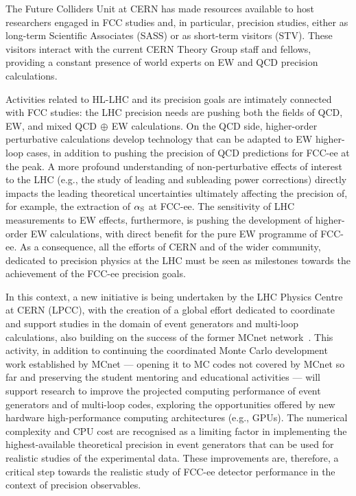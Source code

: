 The Future Colliders Unit at CERN has made resources available to host researchers engaged in FCC studies and, in particular, precision studies, 
either as long-term Scientific Associates (SASS) or as short-term visitors (STV). 
These visitors interact with the current CERN Theory Group staff and fellows, 
providing a constant presence of world experts on EW and QCD precision calculations. 

Activities related to HL-LHC and its precision goals are intimately connected with FCC studies: 
the LHC precision needs are pushing both the fields of QCD, EW, and mixed QCD$\,\oplus\,$EW calculations. 
On the QCD side, higher-order perturbative calculations develop technology that can be adapted to EW higher-loop cases, 
in  addition to pushing the precision of QCD predictions for FCC-ee at the \PZ peak. 
A more profound understanding of non-perturbative effects of interest to the LHC 
(e.g., the study of leading and subleading power corrections) 
directly impacts the leading theoretical uncertainties ultimately affecting the precision of, for example, the extraction of $\alpha_{\rm S}$ at FCC-ee. 
The sensitivity of LHC measurements to EW effects, furthermore, is pushing the development of higher-order EW calculations, 
with direct benefit for the pure EW programme of FCC-ee. 
As a consequence, all the efforts of CERN and of the wider community, dedicated to precision physics at the LHC must be seen as 
milestones towards the achievement of the FCC-ee precision goals. 

In this context, a new initiative is being undertaken by the LHC Physics Centre at CERN (LPCC), 
with the creation of a global effort dedicated to coordinate and support studies in the domain of event generators and multi-loop calculations, 
also building on the success of the former MCnet network~\cite{mcnet}. 
This activity, in addition to continuing the coordinated Monte Carlo development work established by MCnet 
--- opening it to MC codes not covered by MCnet so far and preserving the student mentoring and educational activities --- 
will support research to improve the projected computing performance of event generators and of multi-loop codes, 
exploring the opportunities offered by new hardware high-performance computing architectures (e.g., GPUs). 
The numerical complexity and CPU cost are recognised as a limiting factor in implementing the highest-available theoretical precision in event generators 
that can be used for realistic studies of the experimental data. 
These improvements are, therefore, a critical step towards the realistic study of FCC-ee detector performance in the context of precision observables. 


